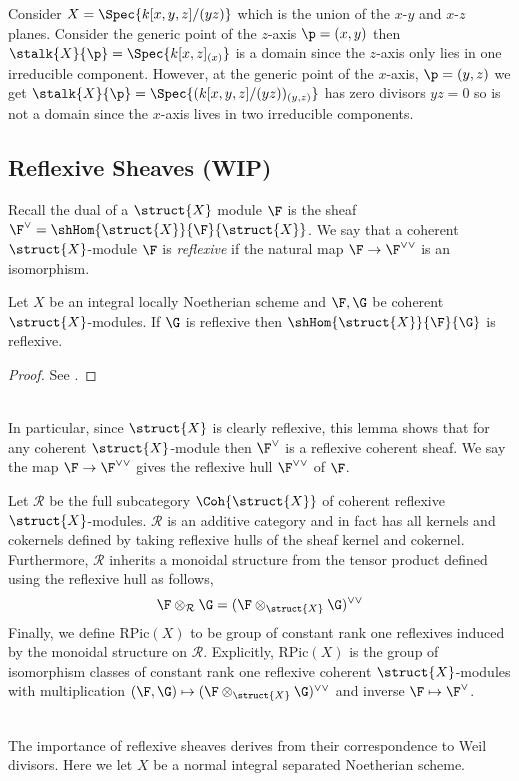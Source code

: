 \documentclass[12pt]{article}
\begin{document}
\begin{example}
 Consider $X = \Spec{k[x,y,z]/(yz)}$ which is the union of the $x$-$y$ and $x$-$z$ planes. Consider the generic point of the $z$-axis $\p = (x, y)$ then $\stalk{X}{\p} = \Spec{k[x, z]_{(x)}}$ is a domain since the $z$-axis only lies in one irreducible component. However, at the generic point of the $x$-axis, $\p = (y, z)$ we get $\stalk{X}{\p} = \Spec{(k[x, y, z]/(yz))_{(y, z)}}$ has zero divisors $yz = 0$ so is not a domain since the $x$-axis lives in two irreducible components.
\end{example}

\subsection{Reflexive Sheaves (WIP)}

\newcommand{\RPic}[1]{\mathrm{RPic}\left( #1 \right)}
\newcommand{\R}{\mathcal{R}}

\begin{defn}
Recall the dual of a $\struct{X}$ module $\F$ is the sheaf $\F^\vee = \shHom{\struct{X}}{\F}{\struct{X}}$. We say that a coherent $\struct{X}$-module $\F$ is \textit{reflexive} if the natural map $\F \to \F^{\vee \vee}$ is an isomorphism. 
\end{defn}

\begin{lemma}
Let $X$ be an integral locally Noetherian scheme and $\F, \G$ be coherent $\struct{X}$-modules. If $\G$ is reflexive then $\shHom{\struct{X}}{\F}{\G}$ is reflexive.
\end{lemma}

\begin{proof}
See \cite[\href{https://stacks.math.columbia.edu/tag/0AY4}{Tag 0AY4}]{stacks-project}.
\end{proof}
\noindent\\
In particular, since $\struct{X}$ is clearly reflexive, this lemma shows that for any coherent $\struct{X}$-module then $\F^\vee$ is a reflexive coherent sheaf. We say the map $\F \to \F^{\vee \vee}$ gives the reflexive hull $\F^{\vee \vee}$ of $\F$.

\begin{defn}
Let $\R$ be the full subcategory $\Coh{\struct{X}}$ of coherent reflexive $\struct{X}$-modules. $\R$ is an additive category   and in fact has all kernels and cokernels defined by taking reflexive hulls of the sheaf kernel and cokernel. Furthermore, $\R$ inherits a monoidal structure from the tensor product defined using the reflexive hull as follows,
\[ \F \otimes_\R \G = (\F \otimes_{\struct{X}} \G)^{\vee \vee} \]
Finally, we define $\RPic{X}$ to be group of constant rank one reflexives induced by the monoidal structure on $\R$. Explicitly, $\RPic{X}$ is the group of isomorphism classes of constant rank one reflexive coherent $\struct{X}$-modules with multiplication $(\F, \G) \mapsto (\F \otimes_{\struct{X}} \G)^{\vee \vee}$ and inverse $\F \mapsto \F^\vee$. 
\end{defn}
\noindent\\
The importance of reflexive sheaves derives from their correspondence to Weil divisors. Here we let $X$ be a normal integral separated Noetherian scheme. 
\end{document}

